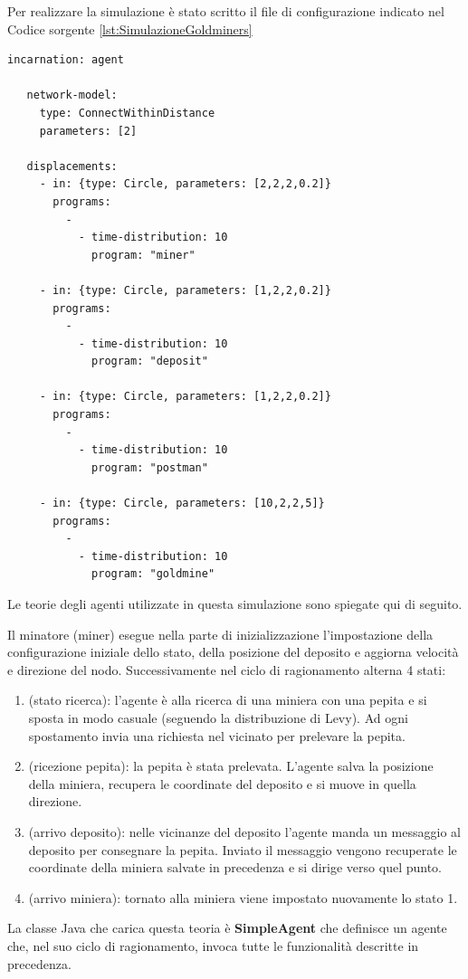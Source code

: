 \documentclass[12pt,a4paper,openright,twoside]{report}
\begin{document}
Per realizzare la simulazione \`e stato scritto il file di configurazione indicato nel Codice sorgente \ref{lst:SimulazioneGoldminers}
\medskip
\begin{lstlisting}[firstnumber=1,label={lst:SimulazioneGoldminers},caption={Simulazione modello agenti su problema Goldminers}]
   incarnation: agent

   network-model:
     type: ConnectWithinDistance
     parameters: [2]

   displacements:
     - in: {type: Circle, parameters: [2,2,2,0.2]}
       programs:
         -
           - time-distribution: 10
             program: "miner"

     - in: {type: Circle, parameters: [1,2,2,0.2]}
       programs:
         -
           - time-distribution: 10
             program: "deposit"

     - in: {type: Circle, parameters: [1,2,2,0.2]}
       programs:
         -
           - time-distribution: 10
             program: "postman"

     - in: {type: Circle, parameters: [10,2,2,5]}
       programs:
         -
           - time-distribution: 10
             program: "goldmine"
\end{lstlisting}

Le teorie degli agenti utilizzate in questa simulazione sono spiegate qui di seguito.

Il minatore (miner) esegue nella parte di inizializzazione l'impostazione della configurazione iniziale dello stato, della posizione del deposito e aggiorna velocit\`a e direzione del nodo.
Successivamente nel ciclo di ragionamento alterna 4 stati:
\begin{enumerate}
   \item (stato ricerca): l'agente \`e alla ricerca di una miniera con una pepita e si sposta in modo casuale (seguendo la distribuzione di Levy). Ad ogni spostamento invia una richiesta nel vicinato per prelevare la pepita.
   \item (ricezione pepita): la pepita \`e stata prelevata. L'agente salva la posizione della miniera, recupera le coordinate del deposito e si muove in quella direzione.
   \item (arrivo deposito): nelle vicinanze del deposito l'agente manda un messaggio al deposito per consegnare la pepita. Inviato il messaggio vengono recuperate le coordinate della miniera salvate in precedenza e si dirige verso quel punto.
   \item (arrivo miniera): tornato alla miniera viene impostato nuovamente lo stato 1.
\end{enumerate}
La classe Java che carica questa teoria \`e \textbf{SimpleAgent} che definisce un agente che, nel suo ciclo di ragionamento, invoca tutte le funzionalit\`a descritte in precedenza.
\end{document}
